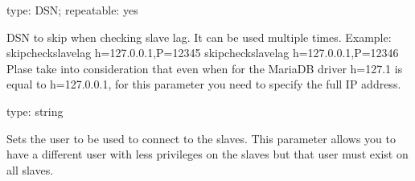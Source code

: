 \documentclass[letterpaper,10pt,english]{sphinxmanual}
\begin{document}
\begin{fulllineitems}
\label{\detokenize{mariadb-schema-change:cmdoption-mariadb-schema-change-skip-check-slave-lag}}
\sphinxAtStartPar
type: DSN; repeatable: yes

\sphinxAtStartPar
DSN to skip when checking slave lag. It can be used multiple times.
Example: \textendash{}skip\sphinxhyphen{}check\sphinxhyphen{}slave\sphinxhyphen{}lag h=127.0.0.1,P=12345 \textendash{}skip\sphinxhyphen{}check\sphinxhyphen{}slave\sphinxhyphen{}lag h=127.0.0.1,P=12346
Plase take into consideration that even when for the MariaDB driver h=127.1 is equal to h=127.0.0.1,
for this parameter you need to specify the full IP address.

\end{fulllineitems}


\begin{fulllineitems}
\label{\detokenize{mariadb-schema-change:cmdoption-mariadb-schema-change-slave-user}}
\sphinxAtStartPar
type: string

\sphinxAtStartPar
Sets the user to be used to connect to the slaves.
This parameter allows you to have a different user with less privileges on the
slaves but that user must exist on all slaves.

\end{fulllineitems}

\end{document}
